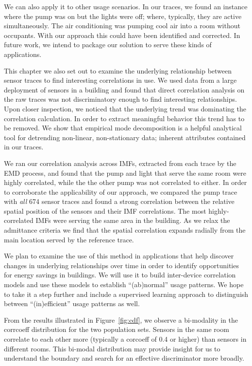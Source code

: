 We can also apply it to other usage scenarios.  In our traces, we found an instance where the pump
was on but the lights were off; where, typically, they are active simultaneously.
The air conditioning was pumping cool air into a room without occupants.
With our approach this could have been identified and corrected.  In future work, we intend to
package our solution to serve these kinds of applications.


This chapter we also set out to examine the underlying relationship between sensor traces to find interesting correlations
in use.  We used data from a large deployment of sensors in a building and found that direct correlation analysis on the raw
traces was not discriminatory enough to find interesting relationships.  Upon closer inspection, we noticed that
the underlying trend was dominating the correlation calculation.  In order to extract meaningful behavior this trend has
to be removed.  We show that empirical mode decomposition is a helpful analytical tool for detrending 
non-linear, non-stationary data; inherent attributes contained in our traces.

We ran our correlation analysis across IMFs, extracted from each trace by the EMD process, and found that the pump and light
that serve the same room were highly correlated, while the the other pump was not correlated to either.
In order to corroborate the applicability
of our approach, we compared the pump trace with \emph{all} 674 sensor traces and found a strong correlation
between the relative spatial position of the sensors and their IMF correlations.  The most highly-correlated IMFs were 
serving the same
area in the building.  As we relax the admittance criteria we find that the spatial correlation expands radially from
the main location served by the reference trace.

We plan to examine the use of this method in applications that help discover changes in underlying relationships over time
in order to identify opportunities for energy savings in buildings.  We will use it to build inter-device correlation models
and use these models to establish ``(ab)normal'' usage patterns.  We hope to take it a step further and include a
supervised learning approach to distinguish between ``(in)efficient'' usage patterns as well.


From the results illustrated in Figure~\ref{fig:cdf}, we observe a bi-modality in the corrcoeff 
distribution for the two population sets.  Sensors in the same room correlate to each other more (typically a corcoeff of 0.4 or higher)
than sensors in different rooms.  %
This bi-modal distribution may provide insight for us to 
understand the boundary and search for an effective discriminator more broadly.

